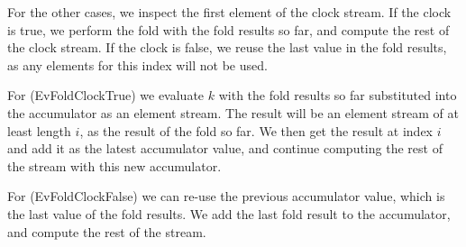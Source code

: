 For the other cases, we inspect the first element of the clock stream.
If the clock is true, we perform the fold with the fold results so far, and compute the rest of the clock stream.
If the clock is false, we reuse the last value in the fold results, as any elements for this index will not be used.

For (EvFoldClockTrue) we evaluate $k$ with the fold results so far substituted into the accumulator as an element stream.
The result will be an element stream of at least length $i$, as the result of the fold so far.
We then get the result at index $i$ and add it as the latest accumulator value, and continue computing the rest of the stream with this new accumulator.

For (EvFoldClockFalse) we can re-use the previous accumulator value, which is the last value of the fold results.
We add the last fold result to the accumulator, and compute the rest of the stream.



